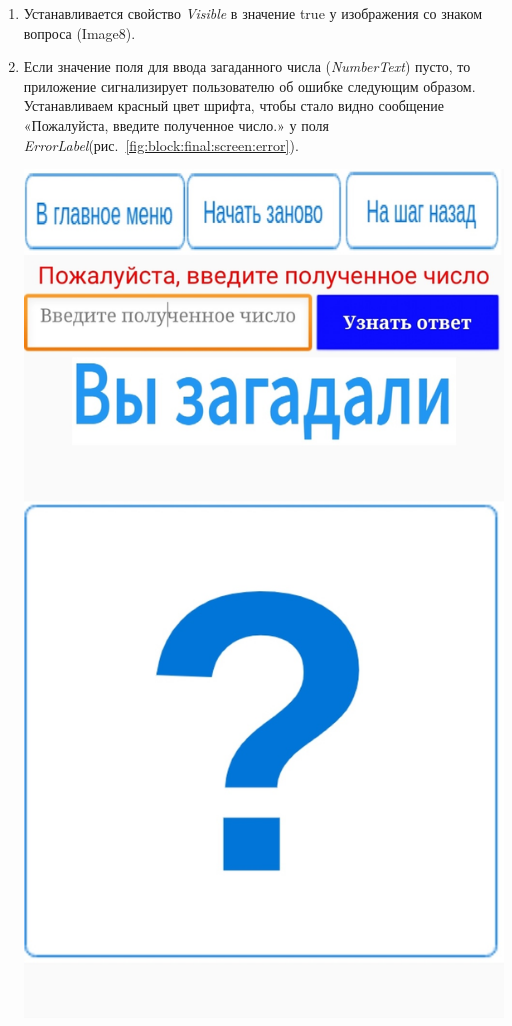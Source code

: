 \begin{enumerate}
  \item Устанавливается свойство \textit{Visible} в значение true у изображения со знаком вопроса (Image8).
  \item Если значение поля для ввода загаданного числа (\textit{NumberText}) пусто, то приложение сигнализирует пользователю об ошибке следующим образом. Устанавливаем красный цвет шрифта, чтобы стало видно сообщение «Пожалуйста, введите полученное число.» у поля \textit{ErrorLabel}(рис.~\ref{fig:block:final:screen:error}).
  \begin{marginfigure}[-2em]
    \includegraphics{./graphics/programs/guess_numbers/finalScreen_Error2_TheGuessingNumbersGame_AppInventor.jpg}

\end{marginfigure}
\end{enumerate}
